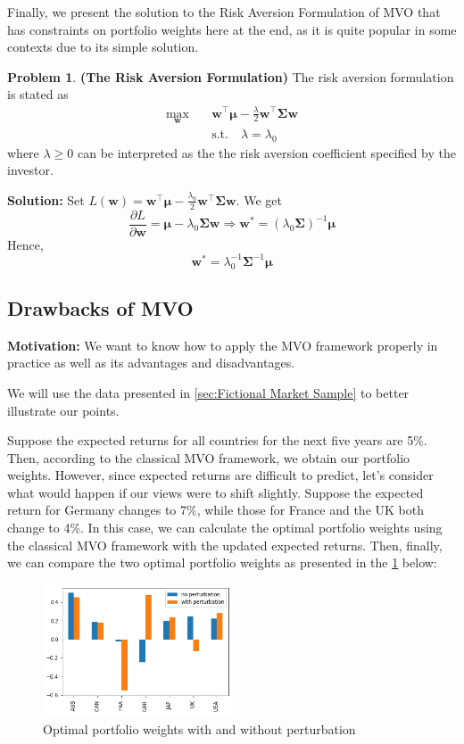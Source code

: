 \documentclass[13pt]{article}
\theoremstyle{definition}
\newtheorem{problem}[theorem]{Problem}
\newenvironment{solution}
{\color{C2}\begin{framed}\begingroup\textbf{Solution:} }
  {\endgroup\end{framed}}
\theoremstyle{remark}
\begin{document}
Finally, we present the solution to the Risk Aversion Formulation of MVO that has constraints on portfolio weights here at the end, as it is quite popular in some contexts due to its simple solution.
\begin{problem}\label{prob:The Risk Aversion Formulation}
    \textbf{(The Risk Aversion Formulation)} The risk aversion formulation is stated as
\begin{align*}
\max _{\bm{w}}\quad & \bm{w}^{\top} \bm{\mu}-\frac{\lambda}{2} \bm{w}^{\top} \mathbf{\Sigma} \bm{w} \\
& \text {s.t.} \quad 
\lambda = \lambda_0
\end{align*}
where $\lambda \geq 0$ can be interpreted as the the risk aversion coefficient specified by the investor.
\end{problem}
\begin{solution}
    Set $L(\bm{w})=\bm{w}^{\top} \bm{\mu}-\frac{\lambda_0}{2} \bm{w}^{\top} \mathbf{\Sigma} \bm{w}$. We get
    \[
    \frac{\partial L}{\partial \bm{w}} =\bm{\mu} - \lambda_0 \mathbf{\Sigma} \bm{w} \Longrightarrow \bm{w}^* = \left(\lambda_0 \mathbf{\Sigma}\right)^{-1}\bm{\mu}
    \]
    Hence, 
    \[
    \bm{w}^* = \lambda_0^{-1}\mathbf{\Sigma}^{-1}\bm{\mu}
    \]
\end{solution}
\subsection{Drawbacks of MVO}
{\color{C6} \textbf{Motivation:} We want to know how to apply the MVO framework properly in practice as well as its advantages and disadvantages.} 

We will use the data presented in \cref{sec:Fictional Market Sample} to better illustrate our points. 

Suppose the expected returns for all countries for the next five years are 5\%. Then, according to the classical MVO framework, we obtain our portfolio weights. However, since expected returns are difficult to predict, let's consider what would happen if our views were to shift slightly. Suppose the expected return for Germany changes to 7\%, while those for France and the UK both change to 4\%. In this case, we can calculate the optimal portfolio weights using the classical MVO framework with the updated expected returns.
Then, finally, we can compare the two optimal portfolio weights as presented in the \cref{fig:MVO flaws} below:
\begin{figure}[!htp]
    \centering
    \includegraphics[width=0.5\textwidth]{MVO flaws.png}
    \caption{Optimal portfolio weights with and without perturbation}
    \label{fig:MVO flaws}
\end{figure}
\end{document}
